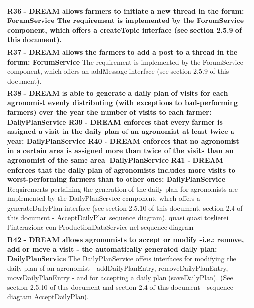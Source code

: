 \documentclass{article}
\begin{document}
\begin{longtable}[c]{|m{11.75cm}|}
    \textbf{R36 - DREAM allows farmers to initiate a new thread in the forum: ForumService}
    \newline\newline
    The requirement is implemented by the ForumService component, which offers a createTopic interface (see section 2.5.9 of this document).\\
    \hline
    
    \textbf{R37 - DREAM allows the farmers to add a post to a thread in the forum: ForumService}
    \newline\newline
    The requirement is implemented by the ForumService component, which offers an addMessage interface (see section 2.5.9 of this document).\\
    \hline
    
    \textbf{R38 - DREAM is able to generate a daily plan of visits for each agronomist evenly distributing (with exceptions to bad-performing farmers) over the year the number of visits to each farmer: DailyPlanService
    \newline\newline
    R39 - DREAM enforces that every farmer is assigned a visit in the daily plan of an agronomist at least twice a year: DailyPlanService
    \newline\newline
    R40 - DREAM enforces that no agronomist in a certain area is assigned more than twice of the visits than an agronomist of the same area: DailyPlanService
    \newline\newline
    R41 - DREAM enforces that the daily plan of agronomists includes more visits to worst-performing farmers than to other ones: DailyPlanService}
    \newline\newline
    Requirements pertaining the generation of the daily plan for agronomists are implemented by the DailyPlanService component, which offers a generateDailyPlan interface (see section 2.5.10 of this document, section 2.4 of this document - AcceptDailyPlan sequence diagram). 
    \color{red}
    quasi quasi toglierei l'interazione con ProductionDataService nel sequence diagram
    \color{black}\\
    \hline
    
    \textbf{R42 - DREAM allows agronomists to accept or modify -i.e.: remove, add or move a visit - the automatically generated daily plan: DailyPlanService}
    \newline\newline
    The DailyPlanService offers interfaces for modifying the daily plan of an agronomist - addDailyPlanEntry, removeDailyPlanEntry, moveDailyPlanEntry - and for accepting a daily plan (saveDailyPlan). (See section 2.5.10 of this document and section 2.4 of this document - sequence diagram AcceptDailyPlan).\\
    \hline
    

\end{longtable}
\end{document}
